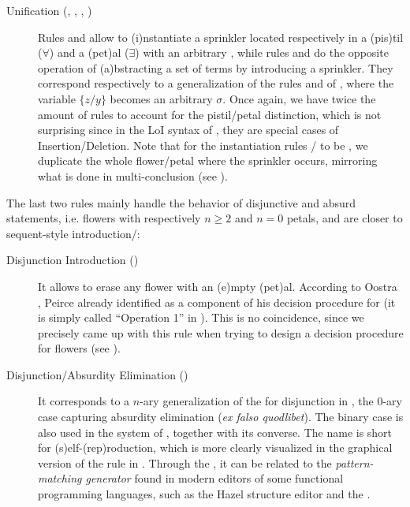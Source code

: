 \begin{scope}
\begin{description}
  \item[Unification (, , , )]
    Rules  and  allow to \textsf{(i)}nstantiate a sprinkler
    located respectively in a \textsf{(pis)}til ($\forall$) and a
    \textsf{(pet)}al ($\exists$) with an arbitrary , while rules
     and  do the opposite operation of
    \textsf{(a)}bstracting a set of terms by introducing a sprinkler. They
    correspond respectively to a generalization of the rules  and
     of , where the variable  $\{z/y\}$
    becomes an arbitrary  $\sigma$. Once again, we have twice the
    amount of rules to account for the pistil/petal distinction, which is not
    surprising since in the LoI syntax of , they are special cases of
    Insertion/Deletion. Note that for the instantiation rules
    / to be , we duplicate the whole flower/petal
    where the sprinkler occurs, mirroring what is done in multi-conclusion
     (see ).
\end{description}

The last two rules mainly handle the behavior of disjunctive and absurd
statements, i.e. flowers with respectively $n \geq 2$ and $n = 0$ petals, and
are closer to sequent-style introduction/:

\begin{description}
  \item[Disjunction Introduction ()]
    It allows to erase any flower with an \textsf{(e)}mpty \textsf{(pet)}al.
    According to Oostra \cite[p.~109]{oostra_advances_2022}, Peirce already
    identified  as a component of his decision procedure for
     (it is simply called ``Operation 1'' in
    \cite{oostra_advances_2022}). This is no coincidence, since we precisely
    came up with this rule when trying to design a decision procedure for
    flowers (see ).

  \item[Disjunction/Absurdity Elimination ()]
    It corresponds to a $n$-ary generalization of the  for disjunction in , the $0$-ary case capturing
    absurdity elimination (\textit{ex falso quodlibet}). The binary case is also
    used in the  system of \cite{minghui_graphical_2019}, together with
    its converse. The name  is short for
    \textsf{(s)}elf-\textsf{(rep)}roduction, which is more clearly visualized in
    the graphical version of the rule in . Through the
    , it can be related to the \emph{pattern-matching
    generator} found in modern editors of some functional programming languages,
    such as the Hazel structure editor and the  
    .
\end{description}


\end{scope}
